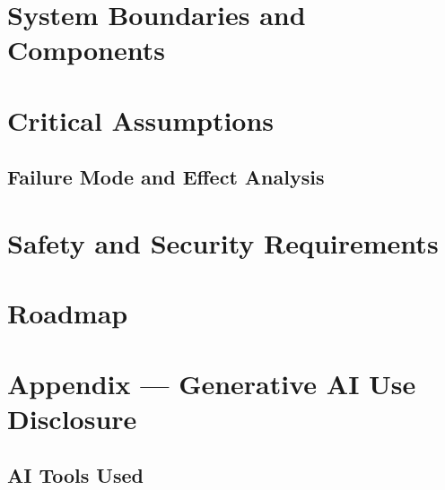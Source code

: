\documentclass{article}
\begin{document}


\section{System Boundaries and Components}




\section{Critical Assumptions}


\newpage

\newpage

\begin{landscape}

\section{Failure Mode and Effect Analysis}



\end{landscape}

\section{Safety and Security Requirements}



\section{Roadmap}



\newpage{}

\section{Appendix --- Generative AI Use Disclosure}

\subsection*{AI Tools Used}
\end{document}
